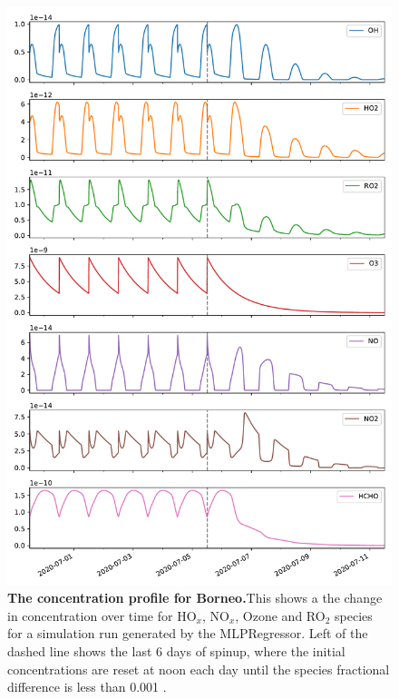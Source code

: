 \newpage


\begin{figure}[H]
    \centering
\includegraphics[width=.9\textwidth]{figures_c3/mlpregressor/conc_borneo.pdf}

\caption{\textbf{The concentration profile for Borneo.}This shows a the change in concentration over time for HO$_x$, NO$_x$, Ozone and RO$_2$ species for a simulation run generated by the MLPRegressor. Left of the dashed line shows the last 6 days of spinup, where the initial concentrations are reset at noon each day until the species fractional difference is less than 0.001 .}
\label{fig:cborneo}
\end{figure}

\newpage


